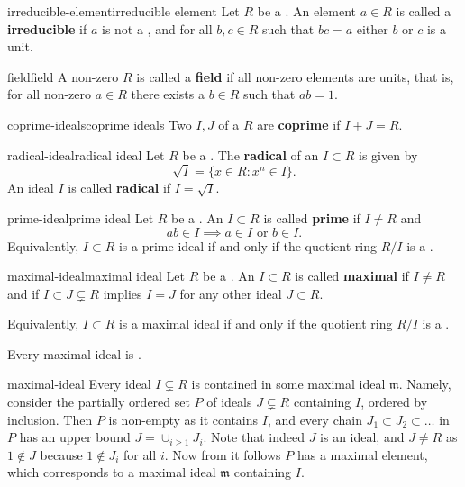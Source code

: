 \begin{topic}{irreducible-element}{irreducible element}
    Let $R$ be a . An element $a \in R$ is called a \textbf{irreducible} if $a$ is not a , and for all $b, c \in R$ such that $bc = a$ either $b$ or $c$ is a unit.
\end{topic}

\begin{topic}{field}{field}
    A non-zero  $R$ is called a \textbf{field} if all non-zero elements are units, that is, for all non-zero $a \in R$ there exists a $b \in R$ such that $ab = 1$. 
\end{topic}

\begin{topic}{coprime-ideals}{coprime ideals}
    Two  $I, J$ of a  $R$ are \textbf{coprime} if $I + J = R$.
\end{topic}

\begin{topic}{radical-ideal}{radical ideal}
    Let $R$ be a . The \textbf{radical} of an  $I \subset R$ is given by
    \[ \sqrt{I} = \{ x \in R : x^n \in I \} . \]
    An ideal $I$ is called \textbf{radical} if $I = \sqrt{I}$.
\end{topic}

\begin{topic}{prime-ideal}{prime ideal}
    Let $R$ be a . An  $I \subset R$ is called \textbf{prime} if $I \ne R$ and
    \[ ab \in I \implies a \in I \text{ or } b \in I . \]
    Equivalently, $I \subset R$ is a prime ideal if and only if the quotient ring $R / I$ is a .
\end{topic}

\begin{topic}{maximal-ideal}{maximal ideal}
    Let $R$ be a . An  $I \subset R$ is called \textbf{maximal} if $I \ne R$ and if $I \subset J \subsetneq R$ implies $I = J$ for any other ideal $J \subset R$.
    
    Equivalently, $I \subset R$ is a maximal ideal if and only if the quotient ring $R / I$ is a .
    
    Every maximal ideal is .
\end{topic}

\begin{example}{maximal-ideal}
    Every ideal $I \subsetneq R$ is contained in some maximal ideal $\mathfrak{m}$. Namely, consider the partially ordered set $P$ of ideals $J \subsetneq R$ containing $I$, ordered by inclusion. Then $P$ is non-empty as it contains $I$, and every chain $J_1 \subset J_2 \subset \ldots$ in $P$ has an upper bound $J = \cup_{i \ge 1} J_i$. Note that indeed $J$ is an ideal, and $J \ne R$ as $1 \not\in J$ because $1 \not\in J_i$ for all $i$.
    Now from  it follows $P$ has a maximal element, which corresponds to a maximal ideal $\mathfrak{m}$ containing $I$.
\end{example}

